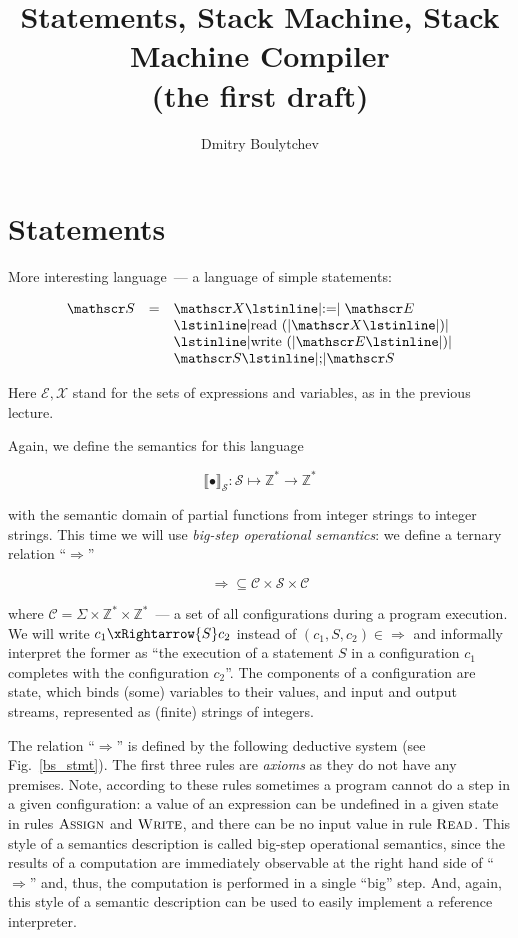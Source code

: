\documentclass{article}
\title{Statements, Stack Machine, Stack Machine Compiler\\
  (the first draft)
}
\author{Dmitry Boulytchev}
\newcommand{\rulename}[1]{\textsc{#1}}
\newcommand{\sembr}[1]{\llbracket{#1}\rrbracket}
\theoremstyle{definition}
\begin{document}
\maketitle

\section{Statements}

More interesting language~--- a language of simple statements:

$$
\begin{array}{rcl}  
  \mathscr S & = & \mathscr X \mbox{\lstinline|:=|} \;\mathscr E \\
             &   & \mbox{\lstinline|read (|} \mathscr X \mbox{\lstinline|)|} \\
             &   & \mbox{\lstinline|write (|} \mathscr E \mbox{\lstinline|)|} \\
             &   & \mathscr S \mbox{\lstinline|;|} \mathscr S
\end{array}
$$

Here $\mathscr E, \mathscr X$ stand for the sets of expressions and variables, as in the previous lecture.

Again, we define the semantics for this language 

$$
\sembr{\bullet}_{\mathscr S} : \mathscr S \mapsto \mathbb Z^* \to \mathbb Z^*
$$

with the semantic domain of partial functions from integer strings to integer strings. This time we will
use \emph{big-step operational semantics}: we define a ternary relation ``$\Rightarrow$''

$$
\Rightarrow \subseteq \mathscr C \times \mathscr S \times \mathscr C
$$

where $\mathscr C = \Sigma \times \mathbb Z^* \times \mathbb Z^*$~--- a set of all configurations during a
program execution. We will write $c_1\xRightarrow{S}c_2$ instead of $(c_1, S, c_2)\in\Rightarrow$ and informally
interpret the former as ``the execution of a statement $S$ in a configuration $c_1$ completes with the configuration
$c_2$''. The components of a configuration are state, which binds (some) variables to their values, and input and
output streams, represented as (finite) strings of integers.

The relation ``$\Rightarrow$'' is defined by the following deductive system (see Fig.~\ref{bs_stmt}). The first
three rules are \emph{axioms} as they do not have any premises. Note, according to these rules sometimes a program
cannot do a step in a given configuration: a value of an expression can be undefined in a given state in rules
$\rulename{Assign}$ and $\rulename{Write}$, and there can be no input value in rule $\rulename{Read}$. This style of
a semantics description is called big-step operational semantics, since the results of a computation are
immediately observable at the right hand side of ``$\Rightarrow$'' and, thus, the computation is performed in
a single ``big'' step. And, again, this style of a semantic description can be used to easily implement a
reference interpreter.
\end{document}
